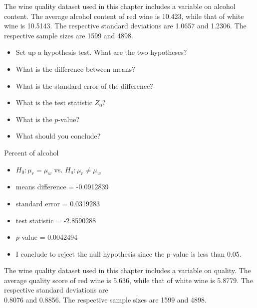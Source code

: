 \documentclass[11pt, chapterprefix=true]{scrbook}\usepackage[]{graphicx}\usepackage[]{color}
\begin{document}
\begin{exercises}
\begin{exercise} %



The wine quality dataset used in this chapter includes a variable on alcohol content. The average alcohol content of red wine is 10.423, while that of white wine is 10.5143. The respective standard deviations are 1.0657 and 1.2306. The respective sample sizes are 1599 and 4898.

\begin{itemize}
  \item Set up a hypothesis test. What are the two hypotheses?
  \item What is the difference between means?
  \item What is the standard error of the difference?
  \item What is the test statistic $Z_0$?
  \item What is the $p$-value?
  \item What should you conclude?
\end{itemize}

\end{exercise}
\begin{solution} %

Percent of alcohol 

\begin{itemize}
  \item $H_0: \mu_r = \mu_w$ vs. $H_a: \mu_r \ne \mu_w$
  \item  means difference = -0.0912839
  \item  standard error  = 0.0319283
  \item  test statistic = -2.8590288
  \item  $p$-value = 0.0042494
  \item  I conclude to reject the null hypothesis since the p-value is less than 0.05.
\end{itemize}

\end{solution}

\begin{exercise} %

The wine quality dataset used in this chapter includes a variable on quality. The average quality score of red wine is 5.636, while that of white wine is 5.8779. The respective standard deviations are \\ 0.8076 and 0.8856. The respective sample sizes are 1599 and 4898.


\end{exercise}
\end{exercises}
\end{document}
